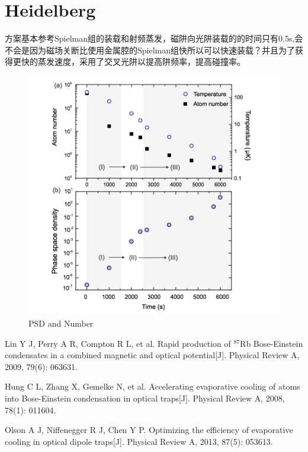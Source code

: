 \documentclass[onecolumn,a4paper,10pt]{article}
\begin{document}
\section{Heidelberg}
方案基本参考Spielman组的装载和射频蒸发，磁阱向光阱装载的的时间只有0.5s,会不会是因为磁场关断比使用金属腔的Spielman组快所以可以快速装载？并且为了获得更快的蒸发速度，采用了交叉光阱以提高阱频率，提高碰撞率。

\begin{figure}[H]
\centering
\includegraphics[width=1\textwidth]{YangBing}
\caption{PSD and Number}
\label{fig4:YangBing}
\end{figure}


\small
\begin{thebibliography}{99}
\setlength{\itemsep}{0pt}
\setlength{\parskip}{0pt}  %
 Lin Y J, Perry A R, Compton R L, et al. Rapid production of $^{87}$Rb Bose-Einstein condensates in a combined magnetic and optical potential[J]. Physical Review A, 2009, 79(6): 063631.

 Hung C L, Zhang X, Gemelke N, et al. Accelerating evaporative cooling of atoms into Bose-Einstein condensation in optical traps[J]. Physical Review A, 2008, 78(1): 011604.

Olson A J, Niffenegger R J, Chen Y P. Optimizing the efficiency of evaporative cooling in optical dipole traps[J]. Physical Review A, 2013, 87(5): 053613.
\end{thebibliography}
\end{document}
